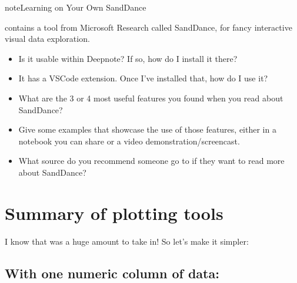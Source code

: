 \documentclass[letterpaper,10pt,english]{jupyterBook}
\begin{document}
\begin{sphinxadmonition}{note}{Learning on Your Own \sphinxhyphen{} SandDance}

\sphinxAtStartPar
{} contains a tool from Microsoft Research called SandDance, for fancy interactive visual data exploration.
\begin{itemize}
\item {} 
\sphinxAtStartPar
Is it usable within Deepnote?  If so, how do I install it there?

\item {} 
\sphinxAtStartPar
It has a VSCode extension.  Once I’ve installed that, how do I use it?

\item {} 
\sphinxAtStartPar
What are the 3 or 4 most useful features you found when you read about SandDance?

\item {} 
\sphinxAtStartPar
Give some examples that showcase the use of those features, either in a notebook you can share or a video demonstration/screencast.

\item {} 
\sphinxAtStartPar
What source do you recommend someone go to if they want to read more about SandDance?

\end{itemize}
\end{sphinxadmonition}


\section{Summary of plotting tools}
\label{\detokenize{chapter-10-visualization:summary-of-plotting-tools}}
\sphinxAtStartPar
I know that was a huge amount to take in!  So let’s make it simpler:


\subsection{With one numeric column of data:}
\label{\detokenize{chapter-10-visualization:with-one-numeric-column-of-data}}
\end{document}
